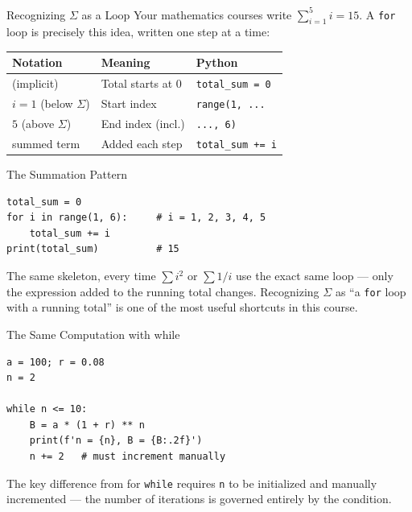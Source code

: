 \documentclass[9pt,aspectratio=169,xcolor=table]{beamer}
\newcommand{\striped}{\rowcolors{1}{white}{stripe}}
\begin{document}
\begin{frame}{Recognizing $\Sigma$ as a Loop}
    \leavevmode
    Your mathematics courses write $\sum_{i=1}^{5} i = 15$. A \texttt{for}
    loop is precisely this idea, written one step at a time:

    \vspace{2mm}
    \striped
    \begin{center}
    \begin{tabular}{p{3.2cm}p{3.2cm}p{3.6cm}}
        \toprule
        \textbf{Notation} & \textbf{Meaning} & \textbf{Python} \\
        \midrule
        (implicit) & Total starts at 0 & \texttt{total\_sum = 0} \\
        $i=1$ (below $\Sigma$) & Start index & \texttt{range(1, ...} \\
        $5$ (above $\Sigma$) & End index (incl.) & \texttt{..., 6)} \\
        summed term & Added each step & \texttt{total\_sum += i} \\
        \bottomrule
    \end{tabular}
    \end{center}
\end{frame}

\begin{frame}[fragile]{The Summation Pattern}
    \leavevmode
\begin{lstlisting}
total_sum = 0
for i in range(1, 6):     # i = 1, 2, 3, 4, 5
    total_sum += i
print(total_sum)          # 15
\end{lstlisting}

    \vspace{2mm}
    \begin{alertblock}{The same skeleton, every time}
        $\sum i^2$ or $\sum 1/i$ use the \alert{exact same loop} ---
        only the expression added to the running total changes.
        Recognizing $\Sigma$ as ``a \texttt{for} loop with a running
        total'' is one of the most useful shortcuts in this course.
    \end{alertblock}
\end{frame}

\begin{frame}[fragile]{The Same Computation with while}
    \leavevmode
\begin{lstlisting}
a = 100; r = 0.08
n = 2

while n <= 10:
    B = a * (1 + r) ** n
    print(f'n = {n}, B = {B:.2f}')
    n += 2   # must increment manually
\end{lstlisting}

    \vspace{2mm}
    \begin{block}{The key difference from for}
        \texttt{while} requires \texttt{n} to be \alert{initialized and
        manually incremented} --- the number of iterations is governed
        entirely by the condition.
    \end{block}
\end{frame}
\end{document}
